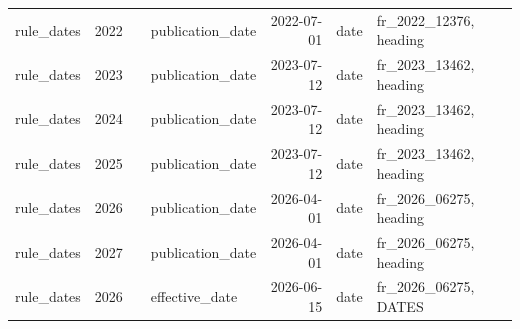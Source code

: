 \begin{longtable}{p{2.3cm}p{0.7cm}p{1.0cm}p{2.6cm}rp{1.7cm}p{4.6cm}}
rule\_dates & 2022 &  & publication\_date & 2022-07-01 & date & fr\_2022\_12376, heading \\
rule\_dates & 2023 &  & publication\_date & 2023-07-12 & date & fr\_2023\_13462, heading \\
rule\_dates & 2024 &  & publication\_date & 2023-07-12 & date & fr\_2023\_13462, heading \\
rule\_dates & 2025 &  & publication\_date & 2023-07-12 & date & fr\_2023\_13462, heading \\
rule\_dates & 2026 &  & publication\_date & 2026-04-01 & date & fr\_2026\_06275, heading \\
rule\_dates & 2027 &  & publication\_date & 2026-04-01 & date & fr\_2026\_06275, heading \\
rule\_dates & 2026 &  & effective\_date & 2026-06-15 & date & fr\_2026\_06275, DATES \\
\end{longtable}
